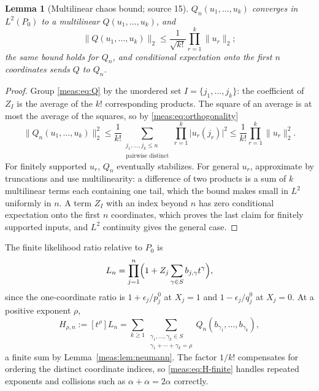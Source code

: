 \documentclass[11pt]{article}
\numberwithin{equation}{section}
\newtheorem{lemma}[theorem]{Lemma}
\theoremstyle{definition}
\theoremstyle{remark}
\newcommand{\coef}[2]{[t^{#1}]#2}
\newcommand{\norm}[1]{\lVert#1\rVert}
\newcommand{\abs}[1]{\lvert#1\rvert}
\begin{document}
\begin{lemma}[Multilinear chaos bound; source 15]\label{meas:lem:chaos}
$Q_n(u_1,\ldots,u_k)$ converges in $L^2(P_0)$ to a multilinear $Q(u_1,\ldots,u_k)$,
and
\begin{equation}\label{meas:eq:chaos-bound}
 \norm{Q(u_1,\ldots,u_k)}_2\le\frac1{\sqrt{k!}}\prod_{r=1}^k\norm{u_r}_2 ;
\end{equation}
the same bound holds for $Q_n$, and conditional expectation onto the first $n$
coordinates sends $Q$ to $Q_n$.
\end{lemma}
\begin{proof}
Group \eqref{meas:eq:Q} by the unordered set $I=\{j_1,\ldots,j_k\}$: the coefficient
of $Z_I$ is the average of the $k!$ corresponding products. The square of an
average is at most the average of the squares, so by
\eqref{meas:eq:orthogonality}
\[
 \norm{Q_n(u_1,\ldots,u_k)}_2^2\le\frac1{k!}
 \sum_{\substack{j_1,\ldots,j_k\le n\\\text{pairwise distinct}}}
 \prod_{r=1}^k\abs{u_r(j_r)}^2\le\frac1{k!}\prod_{r=1}^k\norm{u_r}_2^2 .
\]
For finitely supported $u_r$, $Q_n$ eventually stabilizes. For general $u_r$,
approximate by truncations and use multilinearity: a difference of two products
is a sum of $k$ multilinear terms each containing one tail, which the bound makes
small in $L^2$ uniformly in $n$. A term $Z_I$ with an index beyond $n$ has zero
conditional expectation onto the first $n$ coordinates, which proves the last
claim for finitely supported inputs, and $L^2$ continuity gives the general case.
\end{proof}

The finite likelihood ratio relative to $P_0$ is
\begin{equation}\label{meas:eq:likelihood}
 L_n=\prod_{j=1}^n\Bigl(1+Z_j\sum_{\gamma\in S}b_{j,\gamma}t^\gamma\Bigr),
\end{equation}
since the one-coordinate ratio is $1+\epsilon_j/p_j^0$ at $X_j=1$ and
$1-\epsilon_j/q_j^0$ at $X_j=0$. At a positive exponent $\rho$,
\begin{equation}\label{meas:eq:H-finite}
 H_{\rho,n}:=\coef{\rho}{L_n}=\sum_{k\ge1}
 \sum_{\substack{\gamma_1,\ldots,\gamma_k\in S\\\gamma_1+\cdots+\gamma_k=\rho}}
 Q_n(b_{\gamma_1},\ldots,b_{\gamma_k}),
\end{equation}
a finite sum by Lemma~\ref{meas:lem:neumann}. The factor $1/k!$ compensates for
ordering the distinct coordinate indices, so \eqref{meas:eq:H-finite} handles
repeated exponents and collisions such as $\alpha+\alpha=2\alpha$ correctly.
\end{document}
